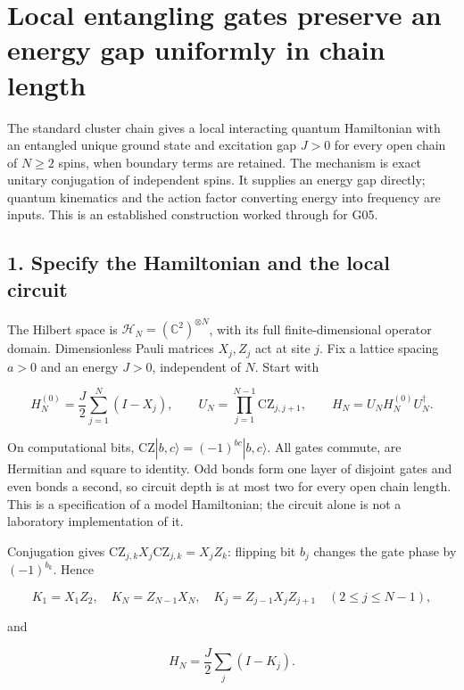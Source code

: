 \documentclass[11pt,a4paper]{article}
\begin{document}
\hypertarget{local-entangling-gates-preserve-an-energy-gap-uniformly-in-chain-length}{%
\section{Local entangling gates preserve an energy gap uniformly in
chain
length}\label{local-entangling-gates-preserve-an-energy-gap-uniformly-in-chain-length}}

The standard cluster chain gives a local interacting quantum Hamiltonian
with an entangled unique ground state and excitation gap \(J>0\) for
every open chain of \(N\ge2\) spins, when boundary terms are retained.
The mechanism is exact unitary conjugation of independent spins. It
supplies an energy gap directly; quantum kinematics and the action
factor converting energy into frequency are inputs. This is an
established construction worked through for G05.

\hypertarget{specify-the-hamiltonian-and-the-local-circuit}{%
\subsection{1. Specify the Hamiltonian and the local
circuit}\label{specify-the-hamiltonian-and-the-local-circuit}}

The Hilbert space is \(\mathcal H_N=(\mathbb C^2)^{\otimes N}\), with
its full finite-dimensional operator domain. Dimensionless Pauli
matrices \(X_j,Z_j\) act at site \(j\). Fix a lattice spacing \(a>0\)
and an energy \(J>0\), independent of \(N\). Start with

\[
H_N^{(0)}=\frac J2\sum_{j=1}^N(I-X_j),\qquad
U_N=\prod_{j=1}^{N-1}\mathrm{CZ}_{j,j+1},\qquad
H_N=U_NH_N^{(0)}U_N^\dagger.
\]

On computational bits, \(\mathrm{CZ}|b,c\rangle=(-1)^{bc}|b,c\rangle\).
All gates commute, are Hermitian and square to identity. Odd bonds form
one layer of disjoint gates and even bonds a second, so circuit depth is
at most two for every open chain length. This is a specification of a
model Hamiltonian; the circuit alone is not a laboratory implementation
of it.

Conjugation gives \(\mathrm{CZ}_{j,k}X_j\mathrm{CZ}_{j,k}=X_jZ_k\):
flipping bit \(b_j\) changes the gate phase by \((-1)^{b_k}\). Hence

\[
K_1=X_1Z_2,\quad K_N=Z_{N-1}X_N,\quad
K_j=Z_{j-1}X_jZ_{j+1}\quad(2\le j\le N-1),
\]

and

\[
H_N=\frac J2\sum_j(I-K_j).
\]
\end{document}
